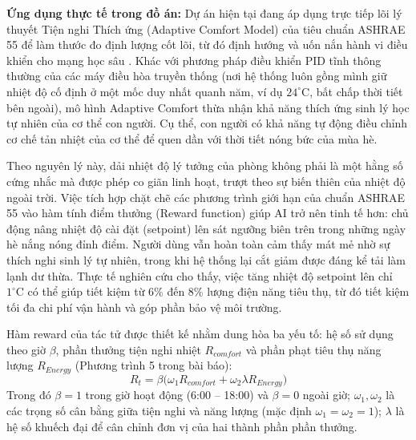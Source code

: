 \documentclass[12pt, a4paper]{report}
\begin{document}
\textbf{Ứng dụng thực tế trong đồ án:} 
Dự án hiện tại đang áp dụng trực tiếp lõi lý thuyết Tiện nghi Thích ứng (Adaptive Comfort Model) của tiêu chuẩn ASHRAE 55 để làm thước đo định lượng cốt lõi, từ đó định hướng và uốn nắn hành vi điều khiển cho mạng học sâu \cite{ashrae55}. Khác với phương pháp điều khiển PID tĩnh thông thường của các máy điều hòa truyền thống (nơi hệ thống luôn gồng mình giữ nhiệt độ cố định ở một mốc duy nhất quanh năm, ví dụ $24^\circ\text{C}$, bất chấp thời tiết bên ngoài), mô hình Adaptive Comfort thừa nhận khả năng thích ứng sinh lý học tự nhiên của cơ thể con người. Cụ thể, con người có khả năng tự động điều chỉnh cơ chế tản nhiệt của cơ thể để quen dần với thời tiết nóng bức của mùa hè.

Theo nguyên lý này, dải nhiệt độ lý tưởng của phòng không phải là một hằng số cứng nhắc mà được phép co giãn linh hoạt, trượt theo sự biến thiên của nhiệt độ ngoài trời. Việc tích hợp chặt chẽ các phương trình giới hạn của chuẩn ASHRAE 55 vào hàm tính điểm thưởng (Reward function) giúp AI trở nên tinh tế hơn: chủ động nâng nhiệt độ cài đặt (setpoint) lên sát ngưỡng biên trên trong những ngày hè nắng nóng đỉnh điểm. Người dùng vẫn hoàn toàn cảm thấy mát mẻ nhờ sự thích nghi sinh lý tự nhiên, trong khi hệ thống lại cắt giảm được đáng kể tải làm lạnh dư thừa. Thực tế nghiên cứu cho thấy, việc tăng nhiệt độ setpoint lên chỉ $1^\circ\text{C}$ có thể giúp tiết kiệm từ 6\% đến 8\% lượng điện năng tiêu thụ, từ đó tiết kiệm tối đa chi phí vận hành và góp phần bảo vệ môi trường.

Hàm reward của tác tử được thiết kế nhằm dung hòa ba yếu tố: hệ số sử dụng theo giờ $\beta$, phần thưởng tiện nghi nhiệt $R_{comfort}$ và phần phạt tiêu thụ năng lượng $R_{Energy}$ (Phương trình 5 trong bài báo):
\begin{equation}
R_t = \beta\bigl(\omega_1 R_{comfort} + \omega_2 \lambda R_{Energy}\bigr)
\end{equation}
Trong đó $\beta = 1$ trong giờ hoạt động (6:00 -- 18:00) và $\beta = 0$ ngoài giờ; $\omega_1, \omega_2$ là các trọng số cân bằng giữa tiện nghi và năng lượng (mặc định $\omega_1 = \omega_2 = 1$); $\lambda$ là hệ số khuếch đại để cân chỉnh đơn vị của hai thành phần phần thưởng.
\end{document}

